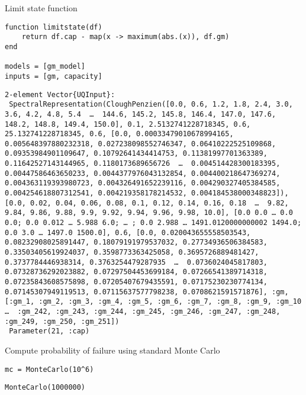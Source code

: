 Limit state function




\begin{verbatim}
function limitstate(df)
    return df.cap - map(x -> maximum(abs.(x)), df.gm)
end

models = [gm_model]
inputs = [gm, capacity]
\end{verbatim}


\begin{verbatim}
2-element Vector{UQInput}:
 SpectralRepresentation(CloughPenzien([0.0, 0.6, 1.2, 1.8, 2.4, 3.0, 3.6, 4.2, 4.8, 5.4  …  144.6, 145.2, 145.8, 146.4, 147.0, 147.6, 148.2, 148.8, 149.4, 150.0], 0.1, 2.5132741228718345, 0.6, 25.132741228718345, 0.6, [0.0, 0.00033479010678994165, 0.005648397880232318, 0.027238098552746347, 0.06410222525109868, 0.09353984901109647, 0.10792641434414753, 0.11381997701363389, 0.11642527143144965, 0.1180173689656726  …  0.004514428300183395, 0.00447586463650233, 0.0044377976043132854, 0.004400218647369274, 0.004363119393980723, 0.004326491652239116, 0.004290327405384585, 0.004254618807312541, 0.004219358178214532, 0.004184538000348823]), [0.0, 0.02, 0.04, 0.06, 0.08, 0.1, 0.12, 0.14, 0.16, 0.18  …  9.82, 9.84, 9.86, 9.88, 9.9, 9.92, 9.94, 9.96, 9.98, 10.0], [0.0 0.0 … 0.0 0.0; 0.0 0.012 … 5.988 6.0; … ; 0.0 2.988 … 1491.0120000000002 1494.0; 0.0 3.0 … 1497.0 1500.0], 0.6, [0.0, 0.020043655558503543, 0.08232908025891447, 0.18079191979537032, 0.27734936506384583, 0.33503405619924037, 0.3598773363425058, 0.3695726889481427, 0.3737784446938314, 0.3763254479287935  …  0.0736024045817803, 0.07328736292023882, 0.07297504453699184, 0.07266541389714318, 0.07235843608575898, 0.07205407679435591, 0.07175230230774134, 0.07145307949119513, 0.07115637577798238, 0.0708621591571876], :gm, [:gm_1, :gm_2, :gm_3, :gm_4, :gm_5, :gm_6, :gm_7, :gm_8, :gm_9, :gm_10  …  :gm_242, :gm_243, :gm_244, :gm_245, :gm_246, :gm_247, :gm_248, :gm_249, :gm_250, :gm_251])
 Parameter(21, :cap)
\end{verbatim}



Compute probability of failure using standard Monte Carlo




\begin{verbatim}
mc = MonteCarlo(10^6)
\end{verbatim}


\begin{verbatim}
MonteCarlo(1000000)
\end{verbatim}



